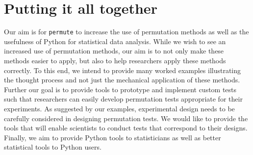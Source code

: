 \section{Putting it all together}

Our aim is for \texttt{permute} to increase the use of permutation methods
as well as the usefulness of Python for statistical data analysis.
While we wish to see an increased use of permutation methods, our aim is to not
only make these methods easier to apply, but also to help researchers
apply these methods correctly.  To this end, we intend to provide many worked
examples illustrating the thought process and not just the mechanical
application of these methods.  Further our goal is to provide tools to
prototype and implement custom tests such that researchers can easily develop
permutation tests appropriate for their experiments.  As suggested by our
examples, experimental design needs to be carefully considered in designing
permutation tests. We would like to provide the tools that will enable scientists
to conduct tests that correspond to their designs.  Finally, we aim to
provide Python tools to statisticians as well as better statistical tools to
Python users.
